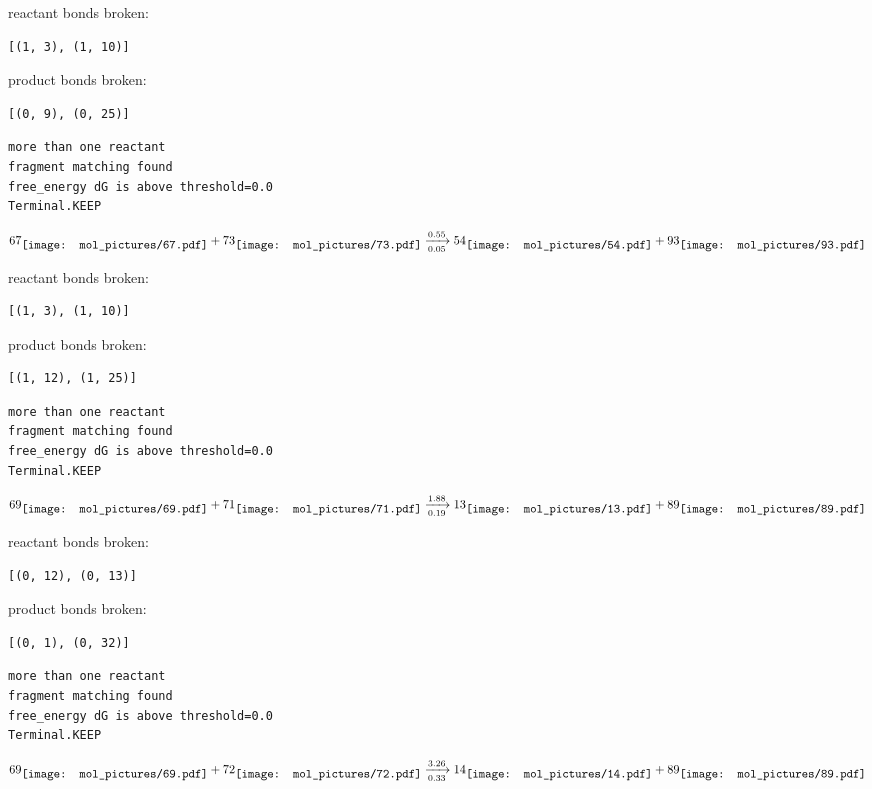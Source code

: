 \documentclass{article}
\begin{document}
reactant bonds broken:\begin{verbatim}
[(1, 3), (1, 10)]
\end{verbatim}
product bonds broken:\begin{verbatim}
[(0, 9), (0, 25)]
\end{verbatim}




\vspace{1cm}
\begin{verbatim}
more than one reactant
fragment matching found
free_energy dG is above threshold=0.0
Terminal.KEEP
\end{verbatim}
$$
67
\raisebox{-.5\height}{\texttt{[image: mol\_pictures/67.pdf]}}
+
73
\raisebox{-.5\height}{\texttt{[image: mol\_pictures/73.pdf]}}
\xrightarrow[0.05]{0.55}
54
\raisebox{-.5\height}{\texttt{[image: mol\_pictures/54.pdf]}}
+
93
\raisebox{-.5\height}{\texttt{[image: mol\_pictures/93.pdf]}}
$$


reactant bonds broken:\begin{verbatim}
[(1, 3), (1, 10)]
\end{verbatim}
product bonds broken:\begin{verbatim}
[(1, 12), (1, 25)]
\end{verbatim}




\vspace{1cm}
\begin{verbatim}
more than one reactant
fragment matching found
free_energy dG is above threshold=0.0
Terminal.KEEP
\end{verbatim}
$$
69
\raisebox{-.5\height}{\texttt{[image: mol\_pictures/69.pdf]}}
+
71
\raisebox{-.5\height}{\texttt{[image: mol\_pictures/71.pdf]}}
\xrightarrow[0.19]{1.88}
13
\raisebox{-.5\height}{\texttt{[image: mol\_pictures/13.pdf]}}
+
89
\raisebox{-.5\height}{\texttt{[image: mol\_pictures/89.pdf]}}
$$


reactant bonds broken:\begin{verbatim}
[(0, 12), (0, 13)]
\end{verbatim}
product bonds broken:\begin{verbatim}
[(0, 1), (0, 32)]
\end{verbatim}




\vspace{1cm}
\begin{verbatim}
more than one reactant
fragment matching found
free_energy dG is above threshold=0.0
Terminal.KEEP
\end{verbatim}
$$
69
\raisebox{-.5\height}{\texttt{[image: mol\_pictures/69.pdf]}}
+
72
\raisebox{-.5\height}{\texttt{[image: mol\_pictures/72.pdf]}}
\xrightarrow[0.33]{3.26}
14
\raisebox{-.5\height}{\texttt{[image: mol\_pictures/14.pdf]}}
+
89
\raisebox{-.5\height}{\texttt{[image: mol\_pictures/89.pdf]}}
$$
\end{document}
